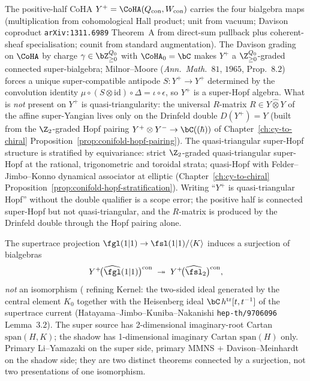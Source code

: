 \begin{remark}
\label{rem:conifold-bialgebra-not-hopf}
The positive-half CoHA $Y^+ = \CoHA(Q_{\mathrm{con}}, W_{\mathrm{con}})$
carries the four bialgebra maps
\textup{(}multiplication from cohomological Hall product; unit from
vacuum; Davison coproduct \texttt{arXiv:1311.6989} Theorem~A from
direct-sum pullback plus coherent-sheaf specialisation; counit from
standard augmentation\textup{).} The Davison grading on $\CoHA$ by
charge $\gamma \in \bZ_{\geq 0}^{Q_0}$ with $\CoHA_0 = \bC$ makes
$Y^+$ a $\Z_{\geq 0}^{Q_0}$-graded connected super-bialgebra; Milnor--Moore
\textup{(}\emph{Ann.~Math.}~$81$, $1965$, Prop.~$8.2$\textup{)} forces
a unique super-compatible antipode $S\colon Y^+ \to Y^+$ determined
by the convolution identity $\mu \circ (S \otimes \mathrm{id}) \circ
\Delta = \iota \circ \epsilon$, so $Y^+$ is a super-Hopf algebra.
What is \emph{not} present on $Y^+$ is quasi-triangularity: the
universal $R$-matrix $R \in Y \hat\otimes Y$ of the affine super-Yangian
lives only on the Drinfeld double $D(Y^+) = Y$ \textup{(}built from the
$\Z_2$-graded Hopf pairing $Y^+ \otimes Y^- \to \bC((\hbar))$ of
Chapter~\ref{ch:cy-to-chiral}
Proposition~\ref{prop:conifold-hopf-pairing}\textup{).} The
quasi-triangular super-Hopf structure is stratified by equivariance:
strict $\Z_2$-graded quasi-triangular super-Hopf at the rational,
trigonometric and toroidal strata; quasi-Hopf with Felder--Jimbo--Konno
dynamical associator at elliptic
\textup{(}Chapter~\ref{ch:cy-to-chiral}
Proposition~\ref{prop:conifold-hopf-stratification}\textup{).} Writing
``$Y^+$ is quasi-triangular Hopf'' without the double qualifier is a
scope error; the positive half is connected super-Hopf but not
quasi-triangular, and the $R$-matrix is produced by the Drinfeld double
through the Hopf pairing alone.
\end{remark}

\begin{remark}
\label{rem:conifold-shadow-surjection}
The supertrace projection $\fgl(1|1) \to \fsl(1|1)/\langle K\rangle$
induces a surjection of bialgebras
\[
 Y^+\!\bigl(\widehat{\fgl}(1|1)\bigr)^{\mathrm{con}}
 \;\twoheadrightarrow\;
 Y^+\!\bigl(\widehat{\fsl}_2\bigr)^{\mathrm{con}},
\]
\emph{not} an isomorphism \textup{(} refining
Kernel: the two-sided ideal generated by the central element $K_0$
together with the Heisenberg ideal $\bC\, h^{\mathrm{tr}}[t, t^{-1}]$
of the supertrace current \textup{(}Hatayama--Jimbo--Kuniba--Nakanishi
\texttt{hep-th/9706096} Lemma~$3.2$\textup{).} The super source has
2-dimensional imaginary-root Cartan $\mathrm{span}(H, K)$; the shadow
has 1-dimensional imaginary Cartan $\mathrm{span}(H)$ only. Primary
Li--Yamazaki on the super side, primary MMNS + Davison--Meinhardt on
the shadow side; they are two distinct theorems connected by a
surjection, not two presentations of one isomorphism.
\end{remark}

